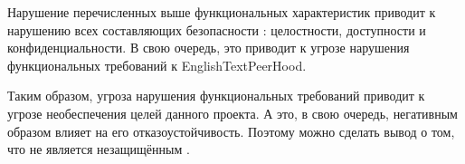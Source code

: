 %
Нарушение перечисленных выше функциональных характеристик приводит к нарушению всех составляющих безопасности : целостности, доступности и конфиденциальности. В свою очередь, это приводит к угрозе нарушения функциональных требований к EnglishText{PeerHood}.

%
Таким образом, угроза нарушения функциональных требований  приводит к угрозе необеспечения целей данного проекта. 
%
А это, в свою очередь, негативным образом влияет на его отказоустойчивость. 
%
Поэтому можно сделать вывод о том, что  не является незащищённым . 